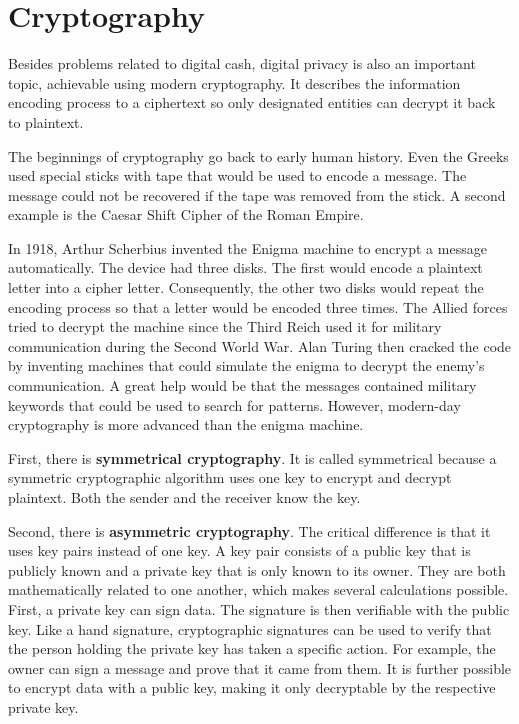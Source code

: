 \section{Cryptography}
Besides problems related to digital cash, digital privacy is also an important topic, achievable using modern cryptography.
It describes the information encoding process to a ciphertext so only designated entities can decrypt it back to plaintext.

The beginnings of cryptography go back to early human history.
Even the Greeks used special sticks with tape that would be used to encode a message.
The message could not be recovered if the tape was removed from the stick.
A second example is the Caesar Shift Cipher of the Roman Empire. \cite{Damico2009}

In 1918, Arthur Scherbius invented the Enigma machine to encrypt a message automatically.
The device had three disks. The first would encode a plaintext letter into a cipher letter.
Consequently, the other two disks would repeat the encoding process so that a letter would be encoded three times.
The Allied forces tried to decrypt the machine since the Third Reich used it for military communication during the Second World War.
Alan Turing then cracked the code by inventing machines that could simulate the enigma to decrypt the enemy's communication.
A great help would be that the messages contained military keywords that could be used to search for patterns. \cite{Crato2010}
However, modern-day cryptography is more advanced than the enigma machine. 

First, there is \textbf{symmetrical cryptography}.
It is called symmetrical because a symmetric cryptographic algorithm uses one key to encrypt and decrypt plaintext.
Both the sender and the receiver know the key.

Second, there is \textbf{asymmetric cryptography}.
The critical difference is that it uses key pairs instead of one key.
A key pair consists of a public key that is publicly known and a private key that is only known to its owner.
They are both mathematically related to one another, which makes several calculations possible.
First, a private key can sign data. 
The signature is then verifiable with the public key.
Like a hand signature, cryptographic signatures can be used to verify that the person holding the private key has taken a specific action.
For example, the owner can sign a message and prove that it came from them.
It is further possible to encrypt data with a public key, making it only decryptable by the respective private key.

